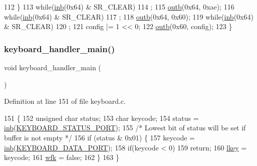 \begin{DoxyCode}
112     \}
113     \textcolor{keywordflow}{while}(\hyperlink{a00164_a0223c8898dfec29069879dc51076e28a_a0223c8898dfec29069879dc51076e28a}{inb}(0x64) & SR\_CLEAR)
114         ;
115     \hyperlink{a00164_aa37f5841c54156a4b14fc0d6f626b44f_aa37f5841c54156a4b14fc0d6f626b44f}{outb}(0x64, 0xae);
116     \textcolor{keywordflow}{while}(\hyperlink{a00164_a0223c8898dfec29069879dc51076e28a_a0223c8898dfec29069879dc51076e28a}{inb}(0x64) & SR\_CLEAR)
117         ;
118     \hyperlink{a00164_aa37f5841c54156a4b14fc0d6f626b44f_aa37f5841c54156a4b14fc0d6f626b44f}{outb}(0x64, 0x60);
119     \textcolor{keywordflow}{while}(\hyperlink{a00164_a0223c8898dfec29069879dc51076e28a_a0223c8898dfec29069879dc51076e28a}{inb}(0x64) & SR\_CLEAR)
120         ;
121     config |= 1 << 0;
122     \hyperlink{a00164_aa37f5841c54156a4b14fc0d6f626b44f_aa37f5841c54156a4b14fc0d6f626b44f}{outb}(0x60, config);
123 \}
\end{DoxyCode}
\mbox{\label{a00041_adffe6abc4a32b3b10985ec9324bce2af_adffe6abc4a32b3b10985ec9324bce2af}} 
\subsubsection{\texorpdfstring{keyboard\+\_\+handler\+\_\+main()}{keyboard\_handler\_main()}}
{\footnotesize\ttfamily void keyboard\+\_\+handler\+\_\+main (\begin{DoxyParamCaption}{ }\end{DoxyParamCaption})}



Definition at line 151 of file keyboard.\+c.


\begin{DoxyCode}
151                                  \{
152     \textcolor{keywordtype}{unsigned} \textcolor{keywordtype}{char} status;
153     \textcolor{keywordtype}{char} keycode;
154     status = \hyperlink{a00164_a0223c8898dfec29069879dc51076e28a_a0223c8898dfec29069879dc51076e28a}{inb}(\hyperlink{a00041_ab79ca089665bc7f5cc151883d1bc69ed_ab79ca089665bc7f5cc151883d1bc69ed}{KEYBOARD\_STATUS\_PORT});
155     \textcolor{comment}{/* Lowest bit of status will be set if buffer is not empty */}
156     \textcolor{keywordflow}{if} (status & 0x01) \{
157         keycode = \hyperlink{a00164_a0223c8898dfec29069879dc51076e28a_a0223c8898dfec29069879dc51076e28a}{inb}(\hyperlink{a00041_a49e0a04e81098085d2948c1e9f8c99cb_a49e0a04e81098085d2948c1e9f8c99cb}{KEYBOARD\_DATA\_PORT});
158         \textcolor{keywordflow}{if}(keycode < 0)
159             \textcolor{keywordflow}{return};
160         \hyperlink{a00038_ade374650022cb30c4f5591a8dafad685_ade374650022cb30c4f5591a8dafad685}{lkey} = keycode;
161         \hyperlink{a00038_a6ddd5223379778858edc46ffbec19775_a6ddd5223379778858edc46ffbec19775}{wfk} = \textcolor{keyword}{false};
162     \}
163 \}
\end{DoxyCode}
